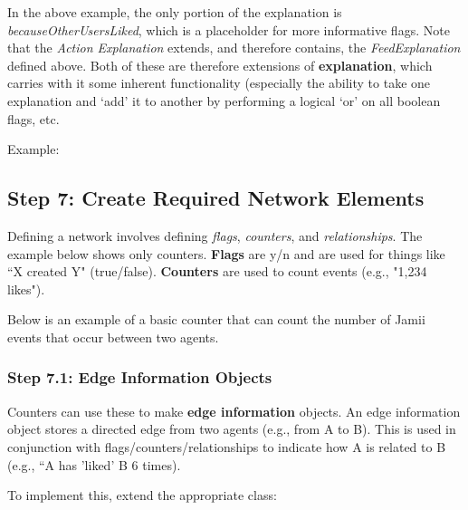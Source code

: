 In the above example, the only portion of the explanation is \textit{becauseOtherUsersLiked}, which is a placeholder for more informative flags. Note that the \emph{Action Explanation} extends, and therefore contains, the \textit{FeedExplanation} defined above. Both of these are therefore extensions of \textbf{explanation}, which carries with it some inherent functionality (especially the ability to take one explanation and `add' it to another by performing a logical `or' on all boolean flags, etc.


Example:





\subsection{Step 7: Create Required Network Elements}
Defining a network involves defining \emph{flags}, \emph{counters}, and \emph{relationships}. The example below shows only counters. \textbf{Flags} are y/n and are used for things like ``X created Y" (true/false). \textbf{Counters} are used to count events (e.g., "1,234 likes").

Below is an example of a basic counter that can count the number of Jamii events that occur between two agents.



\subsubsection{Step 7.1: Edge Information Objects}
Counters can use these to make \textbf{edge information} objects. An edge information object stores a directed edge from two agents (e.g., from A to B). This is used in conjunction with flags/counters/relationships to indicate how A is related to B (e.g., ``A has 'liked' B 6 times).

To implement this, extend the appropriate class:




